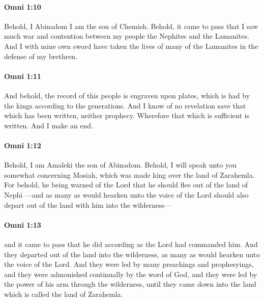 		\paragraph{Omni 1:10} %
			\label{OMNI-1-10}

			Behold, I Abinadom I am the son of Chemish.
			Behold, it came to pass that I saw much war and contention
			between my people the Nephites and the Lamanites.
			And I with mine own sword have taken the lives of many of the Lamanites
			in the defense of my brethren.

		\paragraph{Omni 1:11} %
			\label{OMNI-1-11}

			And behold, the record of this people is engraven upon plates,
			which is had by the kings according to the generations.
			And I know of no revelation save that which has been written, neither prophecy.
			Wherefore that which is sufficient is written.
			And I make an end.

		\paragraph{Omni 1:12} %
			\label{OMNI-1-12}

			Behold, I am Amaleki the son of Abinadom.
			Behold, I will speak unto you somewhat concerning Mosiah,
			which was made king over the land of Zarahemla.
			For behold, he being warned of the Lord
			that he should flee out of the land of Nephi
			---and as many as would hearken unto the voice of the Lord
			should also depart out of the land with him into the wilderness---

		\paragraph{Omni 1:13} %
			\label{OMNI-1-13}

			and it came to pass that he did according as the Lord had commanded him.
			And they departed out of the land into the wilderness,
			as many as would hearken unto the voice of the Lord.
			And they were led by many preachings and prophesyings,
			and they were admonished continually by the word of God,
			and they were led by the power of his arm through the wilderness,
			until they came down into the land which is called the land of Zarahemla.

